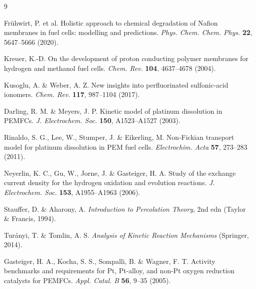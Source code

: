\documentclass[10pt,twocolumn]{article}
\begin{document}

\begin{thebibliography}{9}

 Fr\"uhwirt, P. et al. Holistic approach to chemical degradation of Nafion membranes in fuel cells: modelling and predictions. \textit{Phys. Chem. Chem. Phys.} \textbf{22}, 5647--5666 (2020).

 Kreuer, K.-D. On the development of proton conducting polymer membranes for hydrogen and methanol fuel cells. \textit{Chem. Rev.} \textbf{104}, 4637--4678 (2004).

 Kusoglu, A. \& Weber, A. Z. New insights into perfluorinated sulfonic-acid ionomers. \textit{Chem. Rev.} \textbf{117}, 987--1104 (2017).

 Darling, R. M. \& Meyers, J. P. Kinetic model of platinum dissolution in PEMFCs. \textit{J. Electrochem. Soc.} \textbf{150}, A1523--A1527 (2003).

 Rinaldo, S. G., Lee, W., Stumper, J. \& Eikerling, M. Non-Fickian transport model for platinum dissolution in PEM fuel cells. \textit{Electrochim. Acta} \textbf{57}, 273--283 (2011).

 Neyerlin, K. C., Gu, W., Jorne, J. \& Gasteiger, H. A. Study of the exchange current density for the hydrogen oxidation and evolution reactions. \textit{J. Electrochem. Soc.} \textbf{153}, A1955--A1963 (2006).

 Stauffer, D. \& Aharony, A. \textit{Introduction to Percolation Theory}, 2nd edn (Taylor \& Francis, 1994).

 Tur\'anyi, T. \& Tomlin, A. S. \textit{Analysis of Kinetic Reaction Mechanisms} (Springer, 2014).

 Gasteiger, H. A., Kocha, S. S., Sompalli, B. \& Wagner, F. T. Activity benchmarks and requirements for Pt, Pt-alloy, and non-Pt oxygen reduction catalysts for PEMFCs. \textit{Appl. Catal. B} \textbf{56}, 9--35 (2005).

\end{thebibliography}
\end{document}
